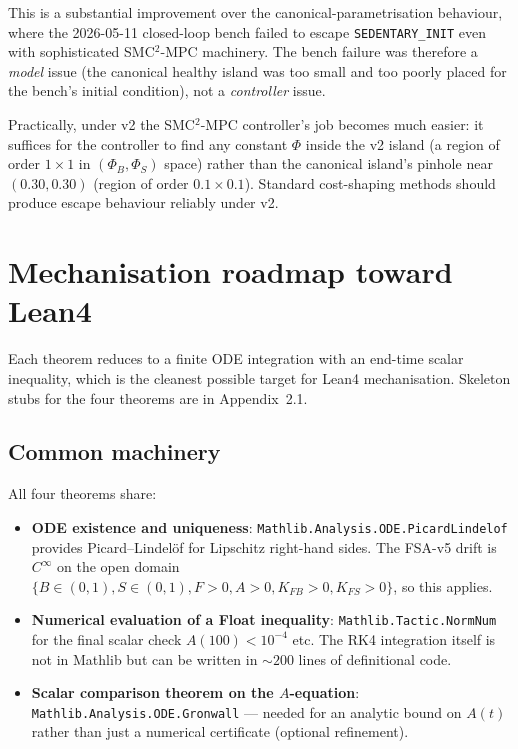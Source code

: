 \documentclass[11pt,a4paper]{article}
\theoremstyle{definition}
\begin{document}
This is a substantial improvement over the canonical-parametrisation behaviour, where the 2026-05-11 closed-loop bench failed to escape \texttt{SEDENTARY\_INIT} even with sophisticated SMC$^2$-MPC machinery. The bench failure was therefore a \emph{model} issue (the canonical healthy island was too small and too poorly placed for the bench's initial condition), not a \emph{controller} issue.

Practically, under v2 the SMC$^2$-MPC controller's job becomes much easier: it suffices for the controller to find any constant $\Phi$ inside the v2 island (a region of order $1 \times 1$ in $(\Phi_B, \Phi_S)$ space) rather than the canonical island's pinhole near $(0.30, 0.30)$ (region of order $0.1 \times 0.1$). Standard cost-shaping methods should produce escape behaviour reliably under v2.

\section{Mechanisation roadmap toward Lean4} \label{sec:lean-roadmap}

Each theorem reduces to a finite ODE integration with an end-time scalar inequality, which is the cleanest possible target for Lean4 mechanisation. Skeleton stubs for the four theorems are in Appendix~2.1.

\subsection{Common machinery}

All four theorems share:
\begin{itemize}
  \item \textbf{ODE existence and uniqueness}: \texttt{Mathlib.Analysis.ODE.PicardLindelof} provides Picard--Lindelöf for Lipschitz right-hand sides. The FSA-v5 drift is $C^\infty$ on the open domain $\{B \in (0, 1), S \in (0, 1), F > 0, A > 0, K_{FB} > 0, K_{FS} > 0\}$, so this applies.
  \item \textbf{Numerical evaluation of a Float inequality}: \texttt{Mathlib.Tactic.NormNum} for the final scalar check $A(100) < 10^{-4}$ etc. The RK4 integration itself is not in Mathlib but can be written in $\sim 200$ lines of definitional code.
  \item \textbf{Scalar comparison theorem on the $A$-equation}: \texttt{Mathlib.Analysis.ODE.Gronwall} — needed for an analytic bound on $A(t)$ rather than just a numerical certificate (optional refinement).
\end{itemize}
\end{document}
